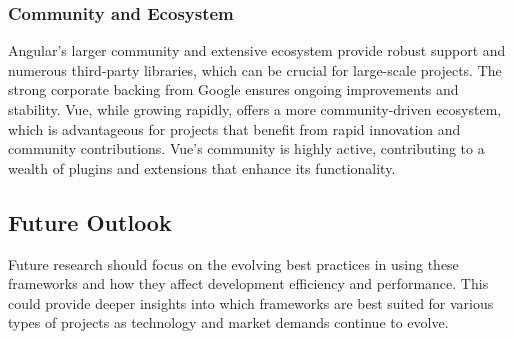 \documentclass[conference]{IEEEtran}
\begin{document}
\newline\subsubsection{Community and Ecosystem} Angular’s larger community and extensive ecosystem provide robust support and numerous third-party libraries, which can be crucial for large-scale projects. The strong corporate backing from Google ensures ongoing improvements and stability. Vue, while growing rapidly, offers a more community-driven ecosystem, which is advantageous for projects that benefit from rapid innovation and community contributions. Vue’s community is highly active, contributing to a wealth of plugins and extensions that enhance its functionality.

\subsection{Future Outlook}
Future research should focus on the evolving best practices in using these frameworks and how they affect development efficiency and performance. This could provide deeper insights into which frameworks are best suited for various types of projects as technology and market demands continue to evolve.
\newline
\end{document}
